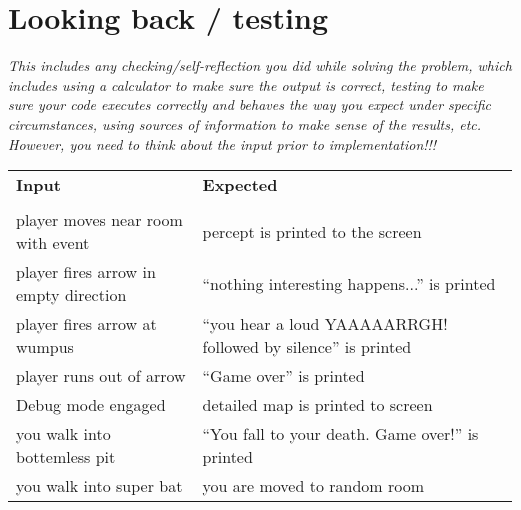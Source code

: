 \documentclass[a4paper, 11pt]{article}
\begin{document}
\section*{Looking back / testing}

\textit{This includes any checking/self-reflection you did while solving the
  problem, which includes using a calculator to make sure the output is correct,
  testing to make sure your code executes correctly and behaves the way you
  expect under specific circumstances, using sources of information to make
  sense of the results, etc. However, you need to think about the input prior to
  implementation!!!}\\
\vspace{5em}

\begin{center}
 \begin{tabular}{l|l} %
   \textbf{Input} & \textbf{Expected} \\
    &    \\
   \hline
   player moves near room with event & percept is printed to the screen \\
   player fires arrow in empty direction& ``nothing interesting happens...'' is printed\\
   player fires arrow at wumpus  & ``you hear a loud YAAAAARRGH! followed by silence'' is printed\\
   player runs out of arrow & ``Game over'' is printed \\
   Debug mode engaged & detailed map is printed to screen \\
   you walk into bottemless pit & ``You fall to your death. Game over!'' is printed \\
   you walk into super bat & you are moved to random room 
 \end{tabular}
\end{center}
\end{document}
